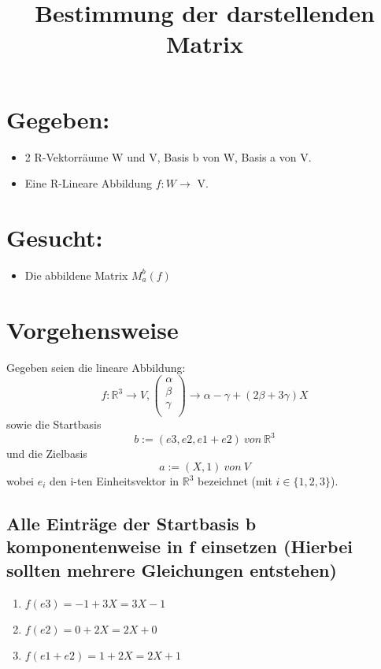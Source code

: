 \documentclass[12pt]{article}
\begin{document}
    \title{Bestimmung der darstellenden Matrix}
    \maketitle
    
    \section{Gegeben:}

    \begin{itemize}
        \item 2 R-Vektorräume W und V, Basis b von W, Basis a von V.
        \item Eine R-Lineare Abbildung $f: W\rightarrow$ V.
    \end{itemize}


    \section{Gesucht:}
    \begin{itemize}
        \item Die abbildene Matrix $M^{b}_a(f)$
    \end{itemize}
    \section{Vorgehensweise}
    Gegeben seien die lineare Abbildung:
    \[f:\mathbb{R}^3\rightarrow V, \begin{pmatrix}\alpha\\\beta\\\gamma\\\end{pmatrix} \rightarrow \alpha - \gamma + (2\beta + 3\gamma)X\]
    sowie die Startbasis \[b := (e3,e2,e1 +e2) \: von \:\mathbb{R}^3\]
    und die Zielbasis \[a := (X ,1) \:von\: V\]
    wobei $e_i$ den i-ten Einheitsvektor in $\mathbb{R}^3$ bezeichnet (mit $i\in\{1,2,3\}$).

    \subsection{Alle Einträge der Startbasis b komponentenweise in f einsetzen (Hierbei sollten mehrere Gleichungen entstehen)}

    \begin{enumerate}
        \item $f (e3) = -1 +3X=3X-1$
        \item $f (e2) = 0 +2X=2X+0$
        \item $f (e1 +e2) = 1 +2X=2X+1$
    \end{enumerate}
\end{document}

